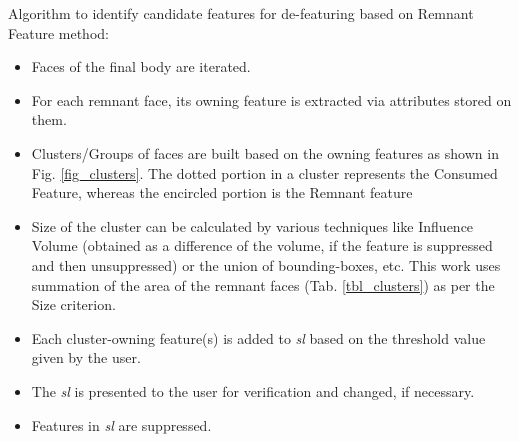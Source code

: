 Algorithm to identify candidate features for de-featuring based on Remnant Feature method:
\begin{itemize}
[noitemsep,topsep=2pt,parsep=2pt,partopsep=2pt]
\item Faces of the final body are iterated. 
\item For each remnant face, its owning feature is extracted via attributes stored on them. 
\item Clusters/Groups of faces are built based on the owning features as shown in Fig. \ref{fig_clusters}. The dotted portion in a cluster represents the Consumed Feature, whereas the encircled portion is the Remnant feature
\item Size of the cluster can be calculated by various techniques like Influence Volume (obtained as a difference of the volume, if the feature is suppressed and then unsuppressed) or the union of bounding-boxes, etc. This work uses summation of the area of the remnant faces (Tab. \ref{tbl_clusters}) as per the Size criterion.
\item Each cluster-owning feature(s) is added to {\em sl} based on the threshold value given by the user.
\item The {\em sl}  is presented to the user for verification and changed, if necessary. 
\item Features in {\em sl} are suppressed.
\end{itemize} 

